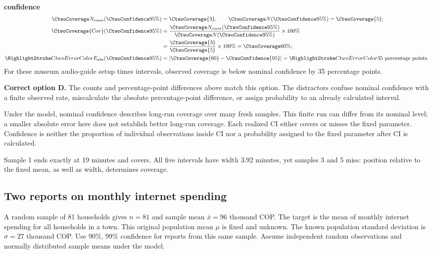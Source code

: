 \textbf{ confidence}\nopagebreak[4]
\begin{align*}
\CtwoCoverCount(\CtwoConfidence{95\%})&=\CtwoCoverage{3},
\qquad\CtwoTotalCount(\CtwoConfidence{95\%})=\CtwoCoverage{5};\\
\CtwoCoverage{\mathrm{Cov}}(\CtwoConfidence{95\%})
&=\frac{\CtwoCoverCount(\CtwoConfidence{95\%})}{\CtwoTotalCount(\CtwoConfidence{95\%})}\times100\%
\\
&=\frac{\CtwoCoverage{3}}{\CtwoCoverage{5}}\times100\%=\CtwoCoverage{60\%};\\
\CtwoError{E_{\rm abs}}(\CtwoConfidence{95\%})
&=\left|\CtwoCoverage{60}-\CtwoConfidence{95}\right|=\CtwoError{35}\ \text{percentage points}.
\end{align*}
For these museum audio-guide setup times intervals, observed coverage is below nominal confidence by 35 percentage points.

\textbf{Correct option D.} The counts and percentage-point differences above match this option. The distractors confuse nominal confidence with a finite observed rate, miscalculate the absolute percentage-point difference, or assign probability to an already calculated interval.

Under the model, nominal confidence describes long-run coverage over many fresh samples. This finite run can differ from its nominal level; a smaller absolute error here does not establish better long-run coverage. Each realized $\mathrm{CI}$ either covers or misses the fixed parameter. Confidence is neither the proportion of individual observations inside $\mathrm{CI}$ nor a probability assigned to the fixed parameter after $\mathrm{CI}$ is calculated.

Sample 1 ends exactly at 19 minutes and covers. All five intervals have width 3.92 minutes, yet samples 3 and 5 miss: position relative to the fixed mean, as well as width, determines coverage.
\par\nopagebreak[4]
\par\vspace{3mm}
\clearpage
\subsection{Two reports on monthly internet spending}
\label{prob:c2-advanced-b}

A random sample of 81 households gives $n=81$ and sample mean $\bar{x}=96$ thousand COP. The target is the mean of monthly internet spending for all households in a town. This original population mean $\mu$ is fixed and unknown. The known population standard deviation is $\sigma=27$ thousand COP. Use 90\%, 99\% confidence for reports from this same sample. Assume independent random observations and normally distributed sample means under the model.

